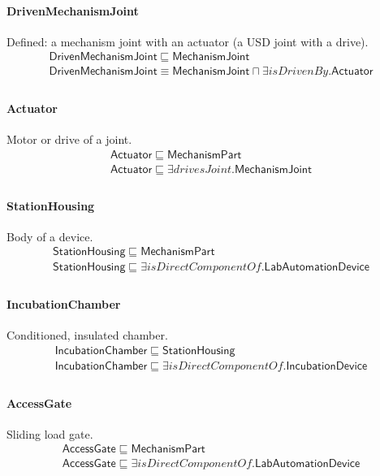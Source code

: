 \documentclass[10pt]{article}
\begin{document}
\paragraph{DrivenMechanismJoint} Defined: a mechanism joint with an actuator (a USD joint with a drive).
\[\begin{array}{l}
\mathsf{DrivenMechanismJoint} \sqsubseteq  \mathsf{MechanismJoint} \\
\mathsf{DrivenMechanismJoint} \equiv  \mathsf{MechanismJoint} \sqcap  \exists \mathit{isDrivenBy}.\mathsf{Actuator} \\
\end{array}\]
\paragraph{Actuator} Motor or drive of a joint.
\[\begin{array}{l}
\mathsf{Actuator} \sqsubseteq  \mathsf{MechanismPart} \\
\mathsf{Actuator} \sqsubseteq  \exists \mathit{drivesJoint}.\mathsf{MechanismJoint} \\
\end{array}\]
\paragraph{StationHousing} Body of a device.
\[\begin{array}{l}
\mathsf{StationHousing} \sqsubseteq  \mathsf{MechanismPart} \\
\mathsf{StationHousing} \sqsubseteq  \exists \mathit{isDirectComponentOf}.\mathsf{LabAutomationDevice} \\
\end{array}\]
\paragraph{IncubationChamber} Conditioned, insulated chamber.
\[\begin{array}{l}
\mathsf{IncubationChamber} \sqsubseteq  \mathsf{StationHousing} \\
\mathsf{IncubationChamber} \sqsubseteq  \exists \mathit{isDirectComponentOf}.\mathsf{IncubationDevice} \\
\end{array}\]
\paragraph{AccessGate} Sliding load gate.
\[\begin{array}{l}
\mathsf{AccessGate} \sqsubseteq  \mathsf{MechanismPart} \\
\mathsf{AccessGate} \sqsubseteq  \exists \mathit{isDirectComponentOf}.\mathsf{LabAutomationDevice} \\
\end{array}\]
\end{document}
